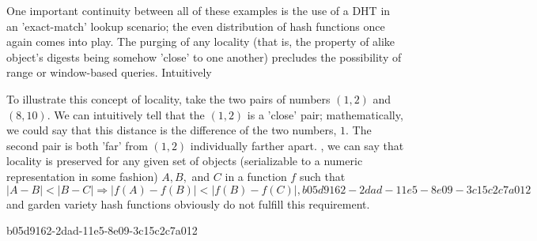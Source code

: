 \documentclass[12pt]{article}
\begin{document}
\par One important continuity between all of these examples is the use of a DHT in an 'exact-match' lookup scenario; the even distribution of hash functions once again comes into play. The purging of any locality (that is, the property of alike object's digests being somehow 'close' to one another) precludes the possibility of range or window-based queries. Intuitively

\par To illustrate this concept of locality, take the two pairs of numbers $(1,2)$ and $(8,10)$. We can intuitively tell that the $(1,2)$ is a 'close' pair; mathematically, we could say that this distance is the difference of the two numbers, $1$. The second pair is both 'far' from $(1,2)$ individually farther apart. , we can say that locality is preserved for any given set of objects (serializable to a numeric representation in some fashion) $A,B,$ and $C$ in a function $f$ such that
\begin{equation}
|A-B| < |B-C| \Rightarrow |f(A)-f(B)| < |f(B) - f(C)|,
b05d9162-2dad-11e5-8e09-3c15c2c7a012\end{equation}
and garden variety hash functions obviously do not fulfill this requirement.

b05d9162-2dad-11e5-8e09-3c15c2c7a012\printbibliography
\end{document}
